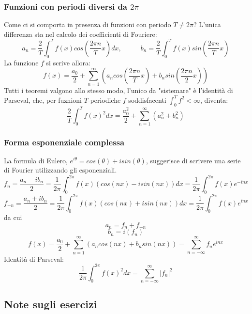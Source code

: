 \subsubsection{Funzioni con periodi diversi da $2\pi$}
Come ci si comporta in presenza di funzioni con periodo $T \neq 2\pi$?\newline
L'unica differenza sta nel calcolo dei coefficienti di Fouriere:
\[
    a_n = \frac{2}{T}\int_{0}^{T}f(x) cos\left( \frac{2\pi n}{T}x \right) dx, \;\;\;\;\; \;\;\;\;\; b_n = \frac{2}{T} \int_{0}^{T}f(x) sin\left( \frac{2\pi n}{T}x \right)
\]
La funzione $f$ si scrive allora:
\[
    f(x) = \frac{a_0}{2} + \sum_{n=1}^{\infty} \left( a_n cos\left( \frac{2\pi n}{T}x \right) + b_n sin \left( \frac{2\pi n}{2}x \right) \right)
\]
Tutti i teoremi valgono allo stesso modo, l'unico da "sistemare" è l'identità di Parseval, che, per fuznioni $T$-periodiche $f$ soddisfacenti $\int_{0}^{T} f^2 < \infty$, diventa:
\[
    \frac{2}{T} \int_{0}^{T}f(x)^2 dx = \frac{a_0^2}{2} + \sum_{n=1}^{\infty} (a_n^2 + b_n^2)
\]
\subsubsection{Forma esponenziale complessa}
La formula di Eulero, $e^{i \theta} = cos(\theta) + i sin(\theta)$, suggerisce di scrivere una serie di Fourier utilizzando gli esponenziali.
\[
    f_n =\frac{a_n-ib_n}{2} = \frac{1}{2\pi} \int_{0}^{2\pi}f(x)(cos(nx) - i sin(nx))dx = \frac{1}{2\pi} \int_{0}^{2\pi}f(x) e^{-inx}
\]
\[
    f_{-n} =\frac{a_n + ib_n}{2} = \frac{1}{2\pi} \int_{0}^{2\pi}f(x)(cos(nx) + i sin(nx))dx = \frac{1}{2\pi} \int_{0}^{2\pi}f(x) e^{inx}
\]
da cui
\[
    a_n = f_n + f_{-n}
\]
\[
    b_n = i (f_n)
\]
\[
    f(x) = \frac{a_0}{2} + \sum_{n=1}^{\infty} \left( a_n cos(nx) + b_n sin(nx) \right) = \sum_{n=-\infty}^{\infty} f_n e^{inx}
\]
\newline
Identità di Parseval:
\[
    \frac{1}{2\pi}\int_{0}^{2\pi}f(x)^2dx = \sum_{n=-\infty}^{\infty}|f_n|^2
\]
\subsection{Note sugli esercizi}
